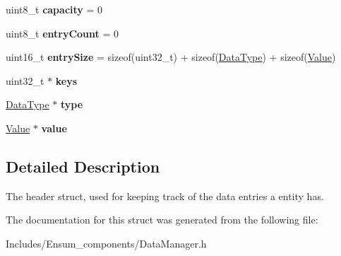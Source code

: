 \begin{DoxyCompactItemize}
\item 
uint8\+\_\+t {\bfseries capacity} = 0\hypertarget{struct_ensum_1_1_components_1_1_data_manager_1_1_entry_header_a654a83e048907493d3547112ce0caf6a}{}\label{struct_ensum_1_1_components_1_1_data_manager_1_1_entry_header_a654a83e048907493d3547112ce0caf6a}

\item 
uint8\+\_\+t {\bfseries entry\+Count} = 0\hypertarget{struct_ensum_1_1_components_1_1_data_manager_1_1_entry_header_aad8d696cdacd86dd94f72f8ddd906090}{}\label{struct_ensum_1_1_components_1_1_data_manager_1_1_entry_header_aad8d696cdacd86dd94f72f8ddd906090}

\item 
uint16\+\_\+t {\bfseries entry\+Size} = sizeof(uint32\+\_\+t) + sizeof(\hyperlink{class_ensum_1_1_components_1_1_data_manager_abf17780149860893e39b561e1d98e1e2}{Data\+Type}) + sizeof(\hyperlink{struct_ensum_1_1_components_1_1_data_manager_1_1_value}{Value})\hypertarget{struct_ensum_1_1_components_1_1_data_manager_1_1_entry_header_a9b0fc71b0985e089450f0e1ef5576768}{}\label{struct_ensum_1_1_components_1_1_data_manager_1_1_entry_header_a9b0fc71b0985e089450f0e1ef5576768}

\item 
uint32\+\_\+t $\ast$ {\bfseries keys}\hypertarget{struct_ensum_1_1_components_1_1_data_manager_1_1_entry_header_a925affe1ceff27a218fc851a73c5a0dc}{}\label{struct_ensum_1_1_components_1_1_data_manager_1_1_entry_header_a925affe1ceff27a218fc851a73c5a0dc}

\item 
\hyperlink{class_ensum_1_1_components_1_1_data_manager_abf17780149860893e39b561e1d98e1e2}{Data\+Type} $\ast$ {\bfseries type}\hypertarget{struct_ensum_1_1_components_1_1_data_manager_1_1_entry_header_ae0b45453ca2df2abc12c0600448a4de5}{}\label{struct_ensum_1_1_components_1_1_data_manager_1_1_entry_header_ae0b45453ca2df2abc12c0600448a4de5}

\item 
\hyperlink{struct_ensum_1_1_components_1_1_data_manager_1_1_value}{Value} $\ast$ {\bfseries value}\hypertarget{struct_ensum_1_1_components_1_1_data_manager_1_1_entry_header_a92f14dfc77b6ca30285d37fa95d1fb5d}{}\label{struct_ensum_1_1_components_1_1_data_manager_1_1_entry_header_a92f14dfc77b6ca30285d37fa95d1fb5d}

\end{DoxyCompactItemize}


\subsection{Detailed Description}
The header struct, used for keeping track of the data entries a entity has. 

The documentation for this struct was generated from the following file\+:\begin{DoxyCompactItemize}
\item 
Includes/\+Ensum\+\_\+components/Data\+Manager.\+h\end{DoxyCompactItemize}
